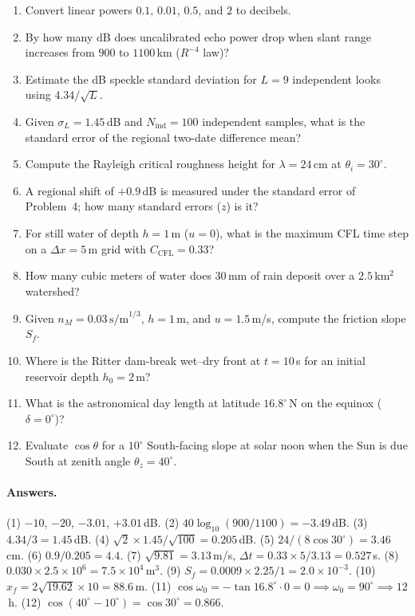 \documentclass[11pt,a4paper]{article}
\begin{document}
\begin{enumerate}
  \item Convert linear powers $0.1$, $0.01$, $0.5$, and $2$ to decibels.
  \item By how many dB does uncalibrated echo power drop when slant range increases from $900$ to $1100$\,km ($R^{-4}$ law)?
  \item Estimate the dB speckle standard deviation for $L=9$ independent looks using $4.34/\sqrt L$.
  \item Given $\sigma_L=1.45$\,dB and $N_{\mathrm{ind}}=100$ independent samples, what is the standard error of the regional two-date difference mean?
  \item Compute the Rayleigh critical roughness height for $\lambda=24$\,cm at $\theta_i=30^\circ$.
  \item A regional shift of $+0.9$\,dB is measured under the standard error of Problem~4; how many standard errors ($z$) is it?
  \item For still water of depth $h=1$\,m ($u=0$), what is the maximum CFL time step on a $\Delta x=5$\,m grid with $C_{\mathrm{CFL}}=0.33$?
  \item How many cubic meters of water does $30$\,mm of rain deposit over a $2.5$\,km$^2$ watershed?
  \item Given $n_M=0.03\,\text{s/m}^{1/3}$, $h=1$\,m, and $u=1.5$\,m/s, compute the friction slope $S_f$.
  \item Where is the Ritter dam-break wet--dry front at $t=10$\,s for an initial reservoir depth $h_0=2$\,m?
  \item What is the astronomical day length at latitude $16.8^\circ$\,N on the equinox ($\delta=0^\circ$)?
  \item Evaluate $\cos\theta$ for a $10^\circ$ South-facing slope at solar noon when the Sun is due South at zenith angle $\theta_z=40^\circ$.
\end{enumerate}

\paragraph{Answers.} (1) $-10$, $-20$, $-3.01$, $+3.01$\,dB. (2) $40\log_{10}(900/1100)=-3.49$\,dB.
(3) $4.34/3=1.45$\,dB. (4) $\sqrt2\times1.45/\sqrt{100}=0.205$\,dB. (5) $24/(8\cos30^\circ)=3.46$\,cm.
(6) $0.9/0.205=4.4$. (7) $\sqrt{9.81}=3.13$\,m/s, $\Delta t=0.33\times5/3.13=0.527$\,s.
(8) $0.030\times2.5\times10^6=7.5\times10^4$\,m$^3$. (9) $S_f=0.0009\times2.25/1=2.0\times10^{-3}$.
(10) $x_f=2\sqrt{19.62}\times10=88.6$\,m. (11) $\cos\omega_0=-\tan16.8^\circ\cdot0=0 \implies \omega_0=90^\circ \implies 12$\,h.
(12) $\cos(40^\circ-10^\circ)=\cos30^\circ=0.866$.
\end{document}
